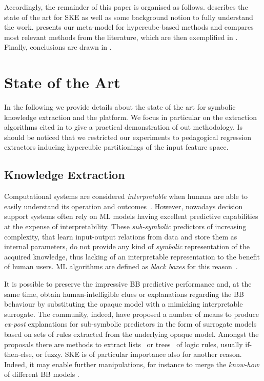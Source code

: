 \documentclass[
]{ceurart}
\begin{document}
Accordingly, the remainder of this paper is organised as follows.
%
 describes the state of the art for SKE as well as some background notion to fully understand the work.
%
 presents our meta-model for hypercube-based methods and compares most relevant methods from the literature, which are then exemplified in .
%
Finally, conclusions are drawn in .

\section{State of the Art}\label{sec:state}

In the following we provide details about the state of the art for symbolic knowledge extraction and the \psyke{} platform.
%
We focus in particular on the extraction algorithms cited in  to give a practical demonstration of out methodology.
%
Is should be noticed that we restricted our experiments to pedagogical regression extractors inducing hypercubic partitionings of the input feature space.

\subsection{Knowledge Extraction}\label{ssec:extraction}

Computational systems are considered \emph{interpretable} when humans are able to easily understand its operation and outcomes~\cite{agentbasedxai-aamas2020}.
%
However, nowadays decision support systems often rely on ML models having excellent predictive capabilities at the expense of interpretability.
%
These \emph{sub-symbolic} predictors of increasing complexity, that learn input-output relations from data and store them as internal parameters, do not provide any kind of \emph{symbolic} representation of the acquired knowledge, thus lacking of an interpretable representation to the benefit of human users.
%
ML algorithms are defined as \emph{black boxes} for this reason~\cite{Lipton2018}.

It is possible to preserve the impressive BB predictive performance and, at the same time, obtain human-intelligible clues or explanations regarding the BB behaviour by substituting the opaque model with a mimicking interpretable surrogate.
%
The \xai{} community, indeed, have proposed a number of means to produce \emph{ex-post} explanations for sub-symbolic predictors in the form of surrogate models based on sets of rules extracted from the underlying opaque model.
%
Amongst the proposals there are methods to extract lists~\cite{craven1994using,huysmans2006iter,gridex-extraamas2021} or trees~\cite{craven1996extracting,breiman1984classification} of logic rules, usually if-then-else, \mofn{} or fuzzy.
%
SKE is of particular importance also for another reason.
%
Indeed, it may enable further manipulations, for instance to merge the \emph{know-how} of different BB models \cite{xmas-aiiot2019}.
\end{document}
